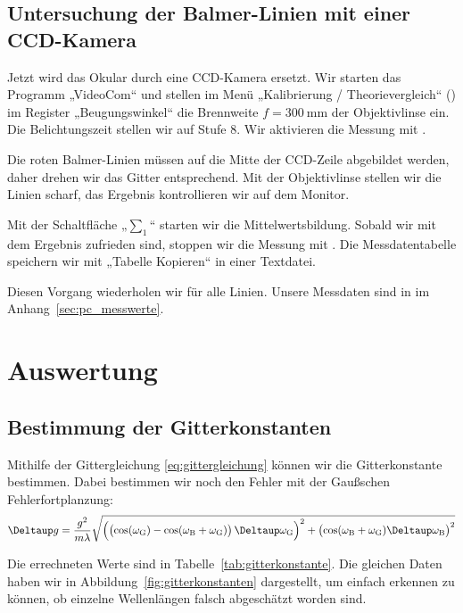 \FloatBarrier
\subsection{Untersuchung der Balmer-Linien mit einer CCD-Kamera}

Jetzt wird das Okular durch eine CCD-Kamera ersetzt. Wir starten das Programm
„VideoCom“ und stellen im Menü „Kalibrierung / Theorievergleich“
() im Register „Beugungswinkel“ die Brennweite $f =
\SI{300}{\milli\meter}$ der Objektivlinse ein. Die Belichtungszeit stellen wir
auf Stufe 8. Wir aktivieren die Messung mit .

Die roten Balmer-Linien müssen auf die Mitte der CCD-Zeile abgebildet werden,
daher drehen wir das Gitter entsprechend. Mit der Objektivlinse stellen wir die
Linien scharf, das Ergebnis kontrollieren wir auf dem Monitor.

Mit der Schaltfläche „$\sum_1$“ starten wir die Mittelwertsbildung. Sobald wir
mit dem Ergebnis zufrieden sind, stoppen wir die Messung mit .
Die Messdatentabelle speichern wir mit „Tabelle Kopieren“ in einer Textdatei.

Diesen Vorgang wiederholen wir für alle Linien. Unsere Messdaten sind in
im Anhang~\ref{sec:pc_messwerte}.

\FloatBarrier
\section{Auswertung}

\FloatBarrier
\subsection{Bestimmung der Gitterkonstanten}

Mithilfe der Gittergleichung \eqref{eq:gittergleichung} können wir die
Gitterkonstante bestimmen. Dabei bestimmen wir noch den Fehler mit der
Gaußschen Fehlerfortplanzung:
\[
    \Deltaup g
    = \frac{g^2}{m\lambda} \sqrt{
        \del{\del{\cos(\omegaG) - \cos(\omegaB +
        \omegaG)} \Deltaup \omegaG}^2
        +
        \del{\cos(\omegaB + \omegaG) \Deltaup \omegaB}^2
    }
\]

Die errechneten Werte sind in Tabelle~\ref{tab:gitterkonstante}. Die gleichen
Daten haben wir in Abbildung~\ref{fig:gitterkonstanten} dargestellt, um einfach
erkennen zu können, ob einzelne Wellenlängen falsch abgeschätzt worden sind.

